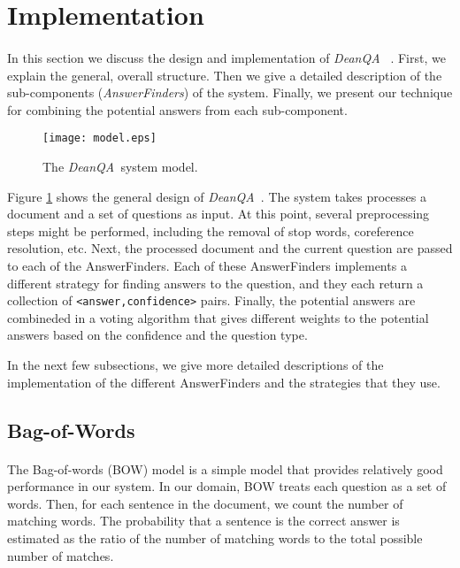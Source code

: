 \documentclass[11pt,letterpaper]{article}
\newcommand{\name}{\emph{DeanQA~}}
\begin{document}
\section{Implementation}
\label{sec:implementation}
\paragraph{}
In this section we discuss the design and implementation of \name
. First, we explain the general, overall structure. Then we give
a detailed description of the sub-components (\emph{AnswerFinders}) of
the system. Finally, we present our technique for combining the
potential answers from each sub-component.

\begin{figure} 
	\centering
	\texttt{[image: model.eps]}
	\caption{The \name system model.}
	\label{fig:model}
\end{figure}

Figure \ref{fig:model} shows the general design of \name.
The system takes processes a document and a set of questions as input.
At this point, several preprocessing steps might be performed,
including the removal of stop words, coreference resolution, etc.
Next, the processed document and the current question are passed to
each of the AnswerFinders. Each of these AnswerFinders implements a
different strategy for finding answers to the question, and they
each return a collection of \texttt{<answer,confidence>} pairs.
Finally, the potential answers are combineded in a voting algorithm
that gives different weights to the potential answers based on the
confidence and the question type.

In the next few subsections, we give more detailed descriptions of
the implementation of the different AnswerFinders and the
strategies that they use.

\subsection{Bag-of-Words}
\paragraph{}
The Bag-of-words (BOW) model is a simple model that provides
relatively good performance in our system. In our domain, BOW treats
each question as a set of words. Then, for each sentence in the
document, we count the number of matching words. The probability that
a sentence is the correct answer is estimated as the ratio of the
number of matching words to the total possible number of matches.
\end{document}
